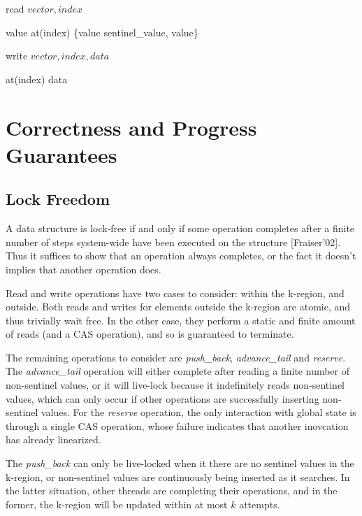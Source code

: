 \documentclass{sigplanconf}
\begin{document}
\begin{algorithm}
\caption{read $vector, index$}
\begin{algorithmic}
\STATE value \as at(index)
\RETURN \{value \eq sentinel\_value, value\}
\end{algorithmic}
\end{algorithm}

\begin{algorithm}
\caption{write $vector, index, data$}
\begin{algorithmic}
\STATE at(index) \as data
\end{algorithmic}
\end{algorithm}




\section{Correctness and Progress Guarantees}
\subsection{Lock Freedom}
A data structure is lock-free if and only if some operation completes
after a finite number of steps system-wide have been executed on the
structure [Fraiser'02]. Thus it suffices to show that an operation
always completes, or the fact it doesn't implies that another operation does.

Read and write operations have two cases to consider: within the k-region,
and outside. Both reads and writes for elements outside the k-region are
atomic, and thus trivially wait free. In the other case, they perform a static and finite amount of reads (and a CAS operation), and so is guaranteed to terminate.

The remaining operations to consider are \emph{push\_back}, \emph{advance\_tail} and \emph{reserve}.
The \emph{advance\_tail} operation will either complete after reading a finite number of non-sentinel values, or it will live-lock because it indefinitely reads non-sentinel values, which can only occur if other operations are successfully inserting non-sentinel values. For the \emph{reserve} operation, the only interaction with global state is through a single CAS operation, whose failure indicates that another inovcation has already linearized.

The \emph{push\_back} can only be live-locked when it there are no sentinel values in the k-region, or non-sentinel values are continuously being inserted as it searches. In the latter situation, other threads are completing their operations, and in the former, the k-region will be updated within at most $k$ attempts.
\end{document}
